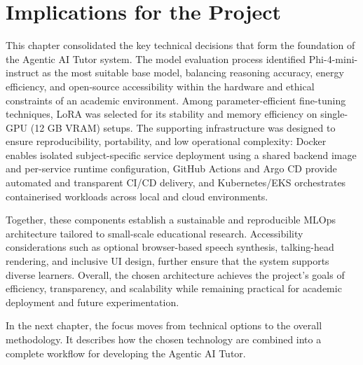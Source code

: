 \section{Implications for the Project}

This chapter consolidated the key technical decisions that form the foundation of the Agentic AI Tutor system. The model evaluation process identified Phi-4-mini-instruct as the most suitable base model, balancing reasoning accuracy, energy efficiency, and open-source accessibility within the hardware and ethical constraints of an academic environment. Among parameter-efficient fine-tuning techniques, LoRA was selected for its stability and memory efficiency on single-GPU (12 GB VRAM) setups. The supporting infrastructure was designed to ensure reproducibility, portability, and low operational complexity: Docker enables isolated subject-specific service deployment using a shared backend image and per-service runtime configuration, GitHub Actions and Argo CD provide automated and transparent CI/CD delivery, and Kubernetes/EKS orchestrates containerised workloads across local and cloud environments. 

Together, these components establish a sustainable and reproducible MLOps architecture tailored to small-scale educational research. Accessibility considerations such as optional browser-based speech synthesis, talking-head rendering, and inclusive UI design, further ensure that the system supports diverse learners. Overall, the chosen architecture achieves the project’s goals of efficiency, transparency, and scalability while remaining practical for academic deployment and future experimentation.

In the next chapter, the focus moves from technical options to the overall methodology. It describes how the chosen technology are combined into a complete workflow for developing the Agentic AI Tutor.

